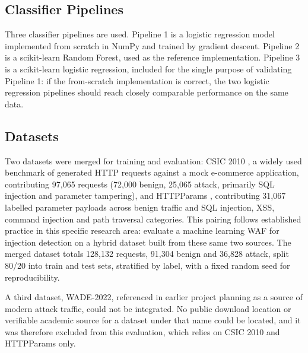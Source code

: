 \documentclass[runningheads]{llncs}
\begin{document}
\subsection{Classifier Pipelines}

Three classifier pipelines are used. Pipeline 1 is a logistic
regression model implemented from scratch in NumPy and trained by
gradient descent. Pipeline 2 is a scikit-learn Random Forest, used as
the reference implementation. Pipeline 3 is a scikit-learn logistic
regression, included for the single purpose of validating Pipeline 1:
if the from-scratch implementation is correct, the two logistic
regression pipelines should reach closely comparable performance on the
same data.

\subsection{Datasets}

Two datasets were merged for training and evaluation: CSIC 2010
\citep{csic2010}, a widely used benchmark of generated HTTP requests
against a mock e-commerce application, contributing 97{,}065 requests
(72{,}000 benign, 25{,}065 attack, primarily SQL injection and
parameter tampering), and HTTPParams \citep{httpparams}, contributing
31{,}067 labelled parameter payloads across benign traffic and SQL
injection, XSS, command injection and path traversal categories. This
pairing follows established practice in this specific research area:
\citet{durmuskaya2025} evaluate a machine learning WAF for injection
detection on a hybrid dataset built from these same two sources. The merged dataset totals
128{,}132 requests, 91{,}304 benign and 36{,}828 attack, split 80/20
into train and test sets, stratified by label, with a fixed random
seed for reproducibility.

A third dataset, WADE-2022, referenced in earlier project planning as
a source of modern attack traffic, could not be integrated. No public
download location or verifiable academic source for a dataset under
that name could be located, and it was therefore excluded from this
evaluation, which relies on CSIC 2010 and HTTPParams only.
\end{document}
